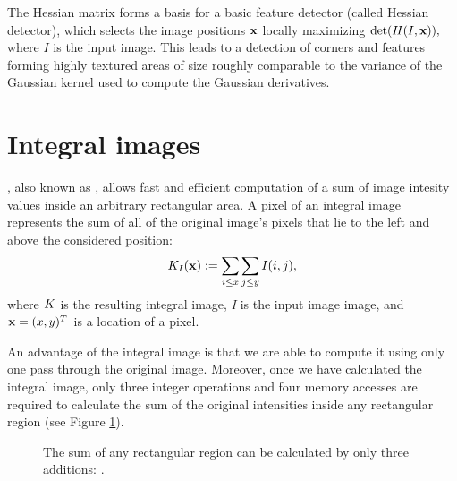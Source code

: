 The Hessian matrix forms a basis for a basic feature detector (called Hessian detector), which selects the image positions $\mathbf{x}$ locally maximizing $\det(H(I, \mathbf{x})),$ where $I$ is the input image.
This leads to a detection of corners and features forming highly textured areas of size roughly comparable to the variance of the Gaussian kernel used to compute the Gaussian derivatives. %

\section{Integral images}

, also known as , allows fast and efficient computation of a sum of image intesity values inside an arbitrary rectangular area.
A pixel of an integral image represents the sum of all of the original image's pixels that lie to the left and above the considered position: 
\begin{equation*}
K_I(\mathbf{x}) := \sum_{i \le x} \sum_{j \le y} I(i,j),
\end{equation*}
where $K$ is the resulting integral image, \emph{I} is the input image image, and $\mathbf{x} = (x, y)^{T}$ is a location of a pixel.

An advantage of the integral image is that we are able to compute it using only one pass through the original image. 
Moreover, once we have calculated the integral image, only three integer operations and four memory accesses are required to calculate the sum 
of the original intensities inside any rectangular region (see Figure \ref{fig:integral}).

\begin{figure}[h]
  \label{fig:integral}
  \caption{The sum of any rectangular region can be calculated by only three additions: .}
 \end{figure}
